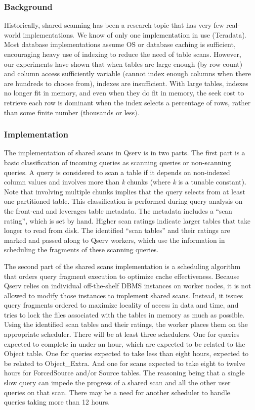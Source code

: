 \documentclass[DM,lsstdraft,toc]{lsstdoc}
\begin{document}
\subsubsection{Background}\label{shared-scan-background}

Historically, shared scanning has been a research topic that has very
few real-world implementations. We know of only one implementation in
use (Teradata). Most database implementations assume OS or database
caching is sufficient, encouraging heavy use of indexing to reduce the
need of table scans. However, our experiments have shown that when
tables are large enough (by row count) and column access sufficiently
variable (cannot index enough columns when there are hundreds to choose
from), indexes are insufficient. With large tables, indexes no longer
fit in memory, and even when they do fit in memory, the seek cost to
retrieve each row is dominant when the index selects a percentage of
rows, rather than some finite number (thousands or less).

\subsubsection{Implementation}\label{shared-scan-implementation}

The implementation of shared scans in Qserv is in two parts. The first
part is a basic classification of incoming queries as scanning queries
or non-scanning queries. A query is considered to scan a table if it
depends on non-indexed column values and involves more than \emph{k}
chunks (where \emph{k} is a tunable constant). Note that involving
multiple chunks implies that the query selects from at least one
partitioned table. This classification is performed during query
analysis on the front-end and leverages table metadata. The metadata
includes a ``scan rating'', which is set by hand. Higher scan ratings
indicate larger tables that take longer to read from disk. The
identified ``scan tables'' and their ratings are marked and passed along
to Qserv workers, which use the information in scheduling the fragments
of these scanning queries.

The second part of the shared scans implementation is a scheduling
algorithm that orders query fragment execution to optimize cache
effectiveness. Because Qserv relies on individual off-the-shelf DBMS
instances on worker nodes, it is not allowed to modify those instances
to implement shared scans. Instead, it issues query fragments ordered to
maximize locality of access in data and time, and tries to lock the
files associated with the tables in memory as much as possible. Using
the identified scan tables and their ratings, the worker places them on
the appropriate scheduler. There will be at least three schedulers. One
for queries expected to complete in under an hour, which are expected to
be related to the Object table. One for queries expected to take less
than eight hours, expected to be related to Object\_Extra. And one for
scans expected to take eight to twelve hours for ForcedSource and/or
Source tables. The reasoning being that a single slow query can impede
the progress of a shared scan and all the other user queries on that
scan. There may be a need for another scheduler to handle queries taking
more than 12 hours.
\end{document}
